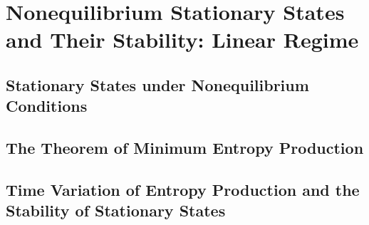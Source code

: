 \chapter{Nonequilibrium Stationary States and Their Stability: Linear Regime}
\section{Stationary States under Nonequilibrium Conditions}
\section{The Theorem of Minimum Entropy Production}
\section{Time Variation of Entropy Production and the Stability of Stationary States}